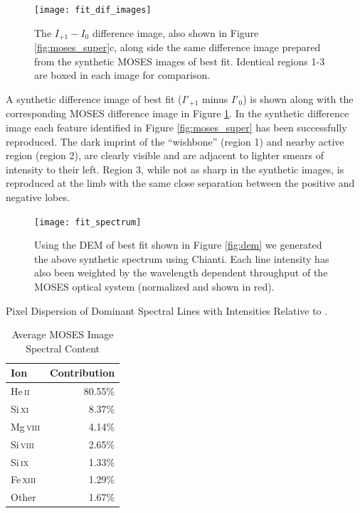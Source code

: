 	
	\begin{figure}
		\centering
		\texttt{[image: fit\_dif\_images]}
		\caption{The $I_{+1}-I_0$ difference image, also shown in Figure \ref{fig:moses_super}c, along side the same difference image prepared from the synthetic MOSES images of best fit.  Identical regions 1-3 are boxed in each image for comparison.}
		\label{fig:dif_image_fit}
		
	\end{figure}
	
	A synthetic difference image of best fit ($I'_{+1}$ minus $I'_0$) is shown along with the corresponding MOSES difference image in Figure \ref{fig:dif_image_fit}.
	In the synthetic difference image each feature identified in Figure \ref{fig:moses_super} has been successfully reproduced.
	The dark imprint of the ``wishbone'' (region 1) and nearby active region (region 2), are clearly visible and are adjacent to lighter smears of intensity to their left.
	Region 3, while not as sharp in the synthetic images, is reproduced at the limb with the same close separation between the positive and negative lobes.
	
	\begin{figure}
		\centering
		\texttt{[image: fit\_spectrum]}
		\caption{Using the DEM of best fit shown in Figure \ref{fig:dem} we generated the above synthetic spectrum using Chianti. Each line intensity has also been weighted by the wavelength dependent throughput of the MOSES optical system (normalized and shown in red).}
		\label{fig:spectrum}
	\end{figure}
	\begin{table}
		\begin{center}
			\caption{Pixel Dispersion of Dominant Spectral Lines with Intensities Relative to .}
			\label{table:disperse}
%			
			
	\end{center}
	\end{table}
	\begin{table}
		\begin{center}
			\caption{Average MOSES Image Spectral Content}
			\label{table:spectral_content}
			\begin{tabular}{l|r}
				\toprule
				Ion & Contribution \\
				\midrule
				He\,\textsc{ii} & 80.55\% \\
				Si\,\textsc{xi} & 8.37\% \\
				Mg\,\textsc{viii} & 4.14\% \\
				Si\,\textsc{viii} & 2.65\% \\
				Si\,\textsc{ix} & 1.33\% \\
				Fe\,\textsc{xiii} & 1.29\% \\
				Other & 1.67\% \\ 
				\bottomrule
			\end{tabular}
		\end{center}
	\end{table} 

